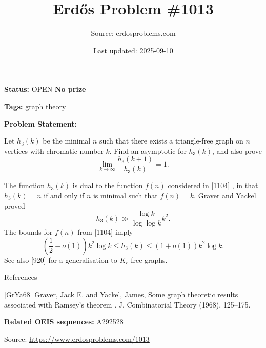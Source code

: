 \documentclass{article}
\title{Erd\H{o}s Problem \#1013}
\date{Last updated: 2025-09-10}
\author{Source: erdosproblems.com}
\begin{document}
\maketitle

\noindent\textbf{Status:} OPEN \quad \textbf{No prize}

\noindent\textbf{Tags:} graph theory

\medskip

\noindent\textbf{Problem Statement:}

Let $h_3(k)$ be the minimal $n$ such that there exists a triangle-free graph on $n$ vertices with chromatic number $k$. Find an asymptotic for $h_3(k)$, and also prove\[\lim_{k\to \infty}\frac{h_3(k+1)}{h_3(k)}=1.\]




The function $h_3(k)$ is dual to the function $f(n)$ considered in [1104] , in that $h_3(k)= n$ if and only if $n$ is minimal such that $f(n)=k$. Graver and Yackel \cite{GrYa68} proved\[h_3(k)\gg \frac{\log k}{\log\log k}k^2.\]The bounds for $f(n)$ from [1104] imply\[\left(\frac{1}{2}-o(1)\right)k^2\log k\leq h_3(k) \leq (1+o(1))k^2\log k.\]See also [920] for a generalisation to $K_r$-free graphs.




References

[GrYa68] Graver, Jack E. and Yackel, James, Some graph theoretic results associated with Ramsey's theorem . J. Combinatorial Theory (1968), 125--175.

\noindent\textbf{Related OEIS sequences:} A292528


\bigskip
\noindent\small{Source: \url{https://www.erdosproblems.com/1013}}
\end{document}
